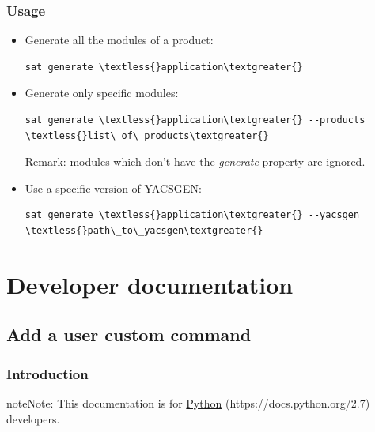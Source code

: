 \documentclass[a4paper,10pt,english]{sphinxmanual}
\begin{document}
\subsection{Usage}
\label{commands/generate:usage}\begin{itemize}
\item {} 
Generate all the modules of a product:

\begin{Verbatim}[commandchars=\\\{\}]
sat generate \textless{}application\textgreater{}
\end{Verbatim}

\item {} 
Generate only specific modules:

\begin{Verbatim}[commandchars=\\\{\}]
sat generate \textless{}application\textgreater{} --products \textless{}list\_of\_products\textgreater{}
\end{Verbatim}

Remark: modules which don't have the \emph{generate} property are ignored.

\item {} 
Use a specific version of YACSGEN:

\begin{Verbatim}[commandchars=\\\{\}]
sat generate \textless{}application\textgreater{} --yacsgen \textless{}path\_to\_yacsgen\textgreater{}
\end{Verbatim}

\end{itemize}


\chapter{Developer documentation}
\label{index:developer-documentation}

\section{Add a user custom command}
\label{write_command:svn}\label{write_command:add-a-user-custom-command}\label{write_command::doc}

\subsection{Introduction}
\label{write_command:introduction}
\begin{notice}{note}{Note:}
This documentation is for \href{https://docs.python.org/2.7}{Python} (https://docs.python.org/2.7) developers.
\end{notice}
\end{document}
